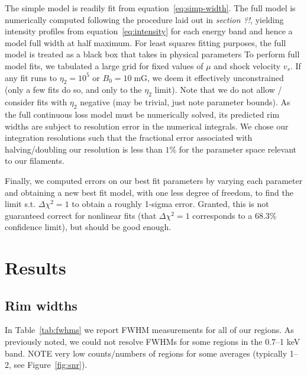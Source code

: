 \documentclass[iop, apj, numberedappendix, twocolappendix]{emulateapj}
\newcommand*{\mt}{\mathrm}
\newcommand*{\unit}[1]{\;\mt{#1}}  %
\begin{document}
The simple model is readily fit from equation~\eqref{eq:simp-width}.
The full model is numerically computed following the procedure laid out in
\emph{section ?!}, yielding intensity profiles from equation~\eqref{eq:intensity} for each
energy band and hence a model full width at half maximum.
For least squares fitting purposes, the full model is treated as a black box
that takes in physical parameters
To perform full model fits, we tabulated a large grid for fixed values of $\mu$
and shock velocity $v_s$.  If any fit runs to $\eta_2 = 10^5$ or $B_0 = 10
\unit{mG}$, we deem it effectively unconstrained (only a few fits do so, and
only to the $\eta_2$ limit).  Note that we do not allow / consider fits with
$\eta_2$ negative (may be trivial, just note parameter bounds).  As the full
continuous loss model must be numerically solved, its predicted rim widths are
subject to resolution error in the numerical integrals.  We chose our
integration resolutions such that the fractional error associated with
halving/doubling our resolution is less than $1\%$ for the parameter space
relevant to our filaments.

Finally, we computed errors on our best fit parameters by varying each
parameter and obtaining a new best fit model, with one less degree of freedom,
to find the limit s.t. $\Delta \chi^2 = 1$ to obtain a roughly 1-sigma error.
Granted, this is not guaranteed correct for nonlinear fits (that $\Delta \chi^2
= 1$ corresponds to a $68.3$\% confidence limit), but should be good enough.

\section{Results}

\subsection{Rim widths}
\label{sec:fwhm-results}

In Table~\ref{tab:fwhms} we report FWHM measurements for all of our regions.
As previously noted, we could not resolve FWHMs for some regions in the 0.7--1 keV band.
NOTE very low counts/numbers of regions for some averages (typically 1--2, see
Figure~\ref{fig:snr}).
\end{document}
